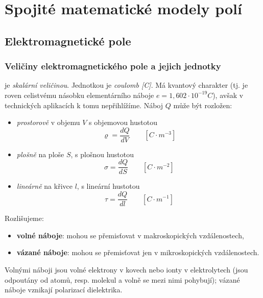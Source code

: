{
\chapter{Spojité matematické modely polí}
\minitoc
  \section{Elektromagnetické pole}       
    \subsection{Veličiny elektromagnetického pole a jejich jednotky}
       je \emph{skalární veličinou}. Jednotkou je \emph{coulomb [C]}. Má
         kvantový charakter (tj. je roven celistvému násobku elementárního náboje $e =
         1,602\cdot10^{-19}C$), avšak v technických aplikacích k tomu nepřihlížíme. Náboj $Q$
         může být rozložen:
         \begin{itemize}\addtolength{\itemsep}{-0.5\baselineskip}
            \item \emph{prostorově} v objemu $V$ s objemovou hustotou
               \begin{equation}\label{TEMP:eq_q_varrho}
                  \varrho = \frac{dQ}{dV} \qquad [C\cdot m^{-3}]
               \end{equation}               
            \item \emph{plošně} na ploše $S$, s plošnou hustotou
               \begin{equation}\label{TEMP:eq_q_sigma}
                  \sigma = \frac{dQ}{dS} \qquad [C\cdot m^{-2}]
               \end{equation}                 
            \item \emph{lineárně} na křivce $l$, s lineární hustotou
               \begin{equation}\label{TEMP:eq_q_tau}
                  \tau = \frac{dQ}{dl} \qquad [C\cdot m^{-1}]
               \end{equation}                 
         \end{itemize}
         Rozlišujeme:
           \begin{itemize}\addtolength{\itemsep}{-0.5\baselineskip}
             \item \textbf{volné náboje}: mohou se přemisťovat v makroskopických
             vzdálenostech,
             \item \textbf{vázané náboje}: mohou se přemisťovat jen v
             mikroskopických vzdálenostech.
           \end{itemize}
         Volnými náboji jsou volné elektrony v kovech nebo ionty v elektrolytech (jsou odpoutány od
         atomů, resp. molekul a volně se mezi nimi pohybují); vázané náboje vznikají polarizací
         dielektrika.
         
}
